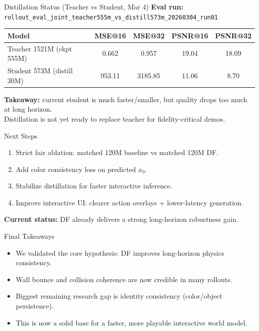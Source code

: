 \documentclass[aspectratio=169,11pt]{beamer}
\begin{document}
\begin{frame}{Distillation Status (Teacher vs Student, Mar 4)}
\textbf{Eval run:} \texttt{rollout\_eval\_joint\_teacher555m\_vs\_distill573m\_20260304\_run01}
\vspace{0.3em}
\begin{table}
\centering
\begin{tabular}{lcccc}
\toprule
Model & MSE@16 & MSE@32 & PSNR@16 & PSNR@32 \\
\midrule
Teacher 1521M (ckpt 555M) & 0.662 & 0.957 & 19.04 & 18.09 \\
Student 573M (distill 30M) & 953.11 & 3185.85 & 11.06 & 8.70 \\
\bottomrule
\end{tabular}
\end{table}
\vspace{0.2em}
\textbf{Takeaway:} current student is much faster/smaller, but quality drops too much at long horizon.\\
Distillation is not yet ready to replace teacher for fidelity-critical demos.
\end{frame}

\begin{frame}{Next Steps}
\begin{enumerate}
  \item Strict fair ablation: matched 120M baseline vs matched 120M DF.
  \item Add color consistency loss on predicted \(x_0\).
  \item Stabilize distillation for faster interactive inference.
  \item Improve interactive UI: clearer action overlays + lower-latency generation.
\end{enumerate}
\vspace{0.5em}
\textbf{Current status:} DF already delivers a strong long-horizon robustness gain.
\end{frame}

\begin{frame}{Final Takeaways}
\begin{itemize}
  \item We validated the core hypothesis: DF improves long-horizon physics consistency.
  \item Wall bounce and collision coherence are now credible in many rollouts.
  \item Biggest remaining research gap is identity consistency (color/object persistence).
  \item This is now a solid base for a faster, more playable interactive world model.
\end{itemize}
\end{frame}
\end{document}
